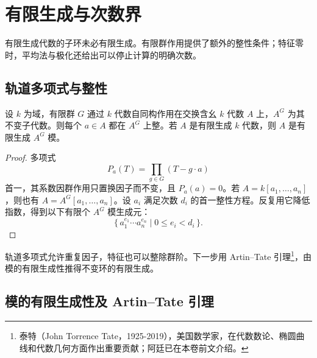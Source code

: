%
%
\section{有限生成与次数界}
\label{b5:sec:2202}

有限生成代数的子环未必有限生成。有限群作用提供了额外的整性条件；特征零时，平均法与极化还给出可以停止计算的明确次数。

\subsection{轨道多项式与整性}
\label{b5:subsec:2202:01}

\begin{proposition}\label{b5:prop:orbit-polynomial-integrality}
	设 \(k\) 为域，有限群 \(G\) 通过 \(k\) 代数自同构作用在交换含幺 \(k\) 代数 \(A\) 上，\(A^G\) 为其不变子代数。则每个 \(a\in A\) 都在 \(A^G\) 上整。若 \(A\) 是有限生成 \(k\) 代数，则 \(A\) 是有限生成 \(A^G\) 模。
\end{proposition}
\begin{proof}
	多项式
	\[
		P_a(T)=\prod_{g\in G}(T-g\cdot a)
	\]
	首一，其系数因群作用只置换因子而不变，且 \(P_a(a)=0\)。若 \(A=k[a_1,\ldots,a_n]\)，则也有 \(A=A^G[a_1,\ldots,a_n]\)。设 \(a_i\) 满足次数 \(d_i\) 的首一整性方程。反复用它降低指数，得到以下有限个 \(A^G\) 模生成元：
	\[
		\{\,a_1^{e_1}\cdots a_n^{e_n}\mid0\le e_i<d_i\,\}.
	\]
\end{proof}

轨道多项式允许重复因子，特征也可以整除群阶。下一步用 Artin--Tate 引理\footnote{泰特（John Torrence Tate，1925-2019），美国数学家，在代数数论、椭圆曲线和代数几何方面作出重要贡献；阿廷已在本卷前文介绍。}，由模的有限生成性推得不变环的有限生成。

\subsection{模的有限生成性及 Artin--Tate 引理}
\label{b5:subsec:2202:02}

